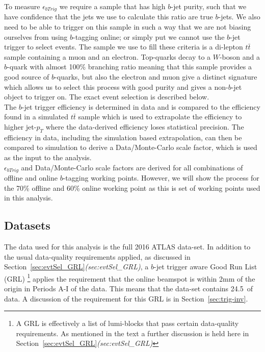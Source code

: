 To measure $\epsilon_{bTrig}$ we require a sample that has high $b$-jet purity,
such that we have confidence that the jets we use to calculate this ratio are true $b$-jets.
We also need to be able to trigger on this sample in such a way that we are not biasing ourselves from using $b$-tagging online;
or simply put we cannot use the $b$-jet trigger to select events.
The sample we use to fill these criteria is a di-lepton $t\bar{t}$ sample containing a muon and an electron.
Top-quarks decay to a $W$-boson and a $b$-quark with almost 100\% branching ratio meaning that this sample provides a good source of $b$-quarks,
but also the electron and muon give a distinct signature which allows us to select this process with good purity and gives a non-$b$-jet object to trigger on.
The exact event selection is described below. \\

The $b$-jet trigger efficiency is determined in data and is compared to the efficiency found in a 
simulated $t\bar{t}$ sample which is used to extrapolate the efficiency to 
higher jet-$p_T$ where the data-derived efficiency loses statistical precision.
The efficiency in data, including the simulation based extrapolation, can then be
compared to simulation to derive a Data/Monte-Carlo scale factor, which is used as the input to the analysis.
\\

$\epsilon_{bTrig}$ and Data/Monte-Carlo scale factors are derived for all combinations of offline and online $b$-tagging working points.
However, we will show the process for the 70\% offline and 60\% online working point
as this is set of working points used in this analysis.

\subsection{Datasets}
The data used for this analysis is the full 2016 ATLAS data-set.
In addition to the usual data-quality requirements applied,
as discussed in Section~\ref{sec:evtSel_GRL}\textit{(sec:evtSel\_GRL)},
a $b$-jet trigger aware Good Run List (GRL)
\footnote{A GRL is effectively a list of lumi-blocks that pass certain data-quality requirements.
  As mentioned in the text a further discussion is held here in Section~\ref{sec:evtSel_GRL}\textit{(sec:evtSel\_GRL)}}
applies the requirement that the online beamspot is within 2mm of the origin in Periods A-I of the data.
This means that the data-set contains 24.5~\ifb of data.
A discussion of the requirement for this GRL is in Section~\ref{sec:trig-inv}. \\

